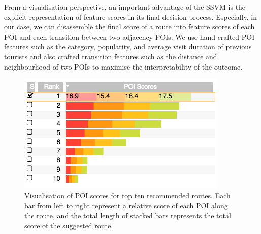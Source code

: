 \documentclass[sigconf]{acmart}
\begin{document}
From a visualisation perspective, an important advantage of the SSVM is the explicit representation of feature scores in its final decision process. Especially, in our case, we can disassemble the final score of a route into feature scores of each POI and each transition between two adjacency POIs. 
We use hand-crafted POI features such as the category, popularity, and average visit duration of previous tourists and also crafted transition features such as the distance and neighbourhood of two POIs to maximise the interpretability of the outcome.

\begin{figure}[t!]
\includegraphics[width=0.9\linewidth]{figure/sample_stack.png}
\caption{Visualisation of POI scores for top ten recommended routes. Each bar from left to right represent a relative score of each POI along the route, and the total length of stacked bars represents the total score of the suggested route.}
\label{fig:stack}
\end{figure}
\end{document}
